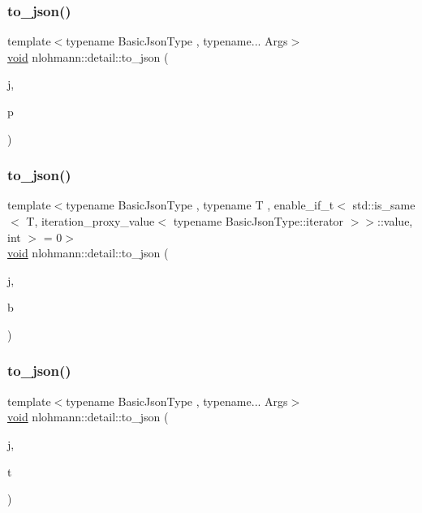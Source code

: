 \subsubsection{\texorpdfstring{to\+\_\+json()}{to\_json()}\hspace{0.1cm}{\footnotesize\ttfamily [15/17]}}
{\footnotesize\ttfamily template$<$typename Basic\+Json\+Type , typename... Args$>$ \\
\hyperlink{namespacenlohmann_1_1detail_a59fca69799f6b9e366710cb9043aa77d}{void} nlohmann\+::detail\+::to\+\_\+json (\begin{DoxyParamCaption}\item[{Basic\+Json\+Type \&}]{j,  }\item[{const std\+::pair$<$ Args... $>$ \&}]{p }\end{DoxyParamCaption})}

\mbox{\label{namespacenlohmann_1_1detail_aaa77b0c9745130b77733a92a1a2e82ec}} 
\subsubsection{\texorpdfstring{to\+\_\+json()}{to\_json()}\hspace{0.1cm}{\footnotesize\ttfamily [16/17]}}
{\footnotesize\ttfamily template$<$typename Basic\+Json\+Type , typename T , enable\+\_\+if\+\_\+t$<$ std\+::is\+\_\+same$<$ T, iteration\+\_\+proxy\+\_\+value$<$ typename Basic\+Json\+Type\+::iterator $>$$>$\+::value, int $>$  = 0$>$ \\
\hyperlink{namespacenlohmann_1_1detail_a59fca69799f6b9e366710cb9043aa77d}{void} nlohmann\+::detail\+::to\+\_\+json (\begin{DoxyParamCaption}\item[{Basic\+Json\+Type \&}]{j,  }\item[{const T \&}]{b }\end{DoxyParamCaption})}

\mbox{\label{namespacenlohmann_1_1detail_aa7a47b08eee864c2c108c04954919648}} 
\subsubsection{\texorpdfstring{to\+\_\+json()}{to\_json()}\hspace{0.1cm}{\footnotesize\ttfamily [17/17]}}
{\footnotesize\ttfamily template$<$typename Basic\+Json\+Type , typename... Args$>$ \\
\hyperlink{namespacenlohmann_1_1detail_a59fca69799f6b9e366710cb9043aa77d}{void} nlohmann\+::detail\+::to\+\_\+json (\begin{DoxyParamCaption}\item[{Basic\+Json\+Type \&}]{j,  }\item[{const std\+::tuple$<$ Args... $>$ \&}]{t }\end{DoxyParamCaption})}

